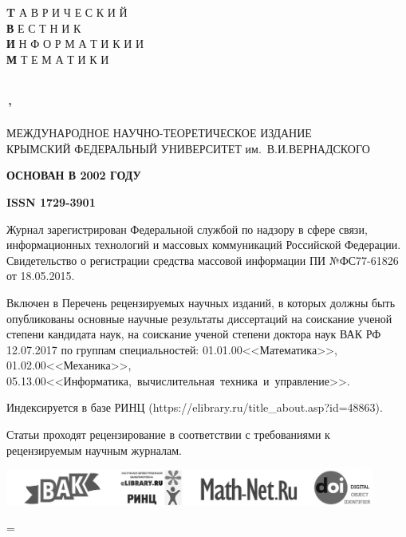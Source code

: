 \thispagestyle{empty}

\parindent=0mm
\myinter=2pt

{\Huge\sf \textbf{T} }{\Large\sf А В Р И Ч Е С К И Й}\\%

{\Huge\sf \textbf{В} }{\Large\sf Е С Т Н И К}\\%

{\Huge\sf \textbf{И} }{\Large\sf Н Ф О Р М А Т И К И \; И}\\%

{\Huge\sf \textbf{М} }{\Large{} Т Е М А Т И К И}\\%
\\\\
{\Large\textbf{\textsf{\tvimnumber\,'\;\tvimyear}}}
\vspace{1cm}

{\footnotesize\sf\def\baselinestretch{1}
МЕЖДУНАРОДНОЕ НАУЧНО-ТЕОРЕТИЧЕСКОЕ ИЗДАНИЕ\\
КРЫМСКИЙ ФЕДЕРАЛЬНЫЙ УНИВЕРСИТЕТ им.~В.\;И.\;ВЕРНАДСКОГО}

\vspace{0.7cm}%
{\footnotesize\sf \textbf{ОСНОВАН В 2002 ГОДУ}}

\vspace{0.5cm}%
{\footnotesize\sf \textbf{ISSN 1729-3901}}

\vspace{0.5cm}%

{\footnotesize\sf Журнал зарегистрирован Федеральной службой по надзору в сфере
связи, информационных \mbox{технологий} и массовых коммуникаций Российской
Федерации. Свидетельство о регистрации средства массовой информации ПИ
№ФС77-61826 от 18.05.2015.}

\vspace{0.5cm}
{\footnotesize\sf Включен в Перечень рецензируемых научных изданий, в которых
должны быть опубликованы \mbox{основные} научные результаты диссертаций на
соискание \mbox{ученой} степени кандидата наук, на соискание \mbox{ученой}
степени доктора наук ВАК РФ 12.07.2017 по группам специальностей:
\mbox{01.01.00\;<<Математика>>}, \mbox{01.02.00\;<<Механика>>},
\mbox{05.13.00\;<<Информатика, вычислительная техника и управление>>.}}

\vspace{0.4cm}

{\footnotesize\sf 
Индексируется в базе РИНЦ (https://elibrary.ru/title\_about.asp?id=48863).}

\vspace{0.3cm}
{\footnotesize\sf
Статьи проходят рецензирование в соответствии с требованиями к рецензируемым
научным журналам.}

\enlargethispage{\baselineskip}
\vfill

\includegraphics[height=1.2cm]{logo/logos_gray}

\parindent=\myparindent
